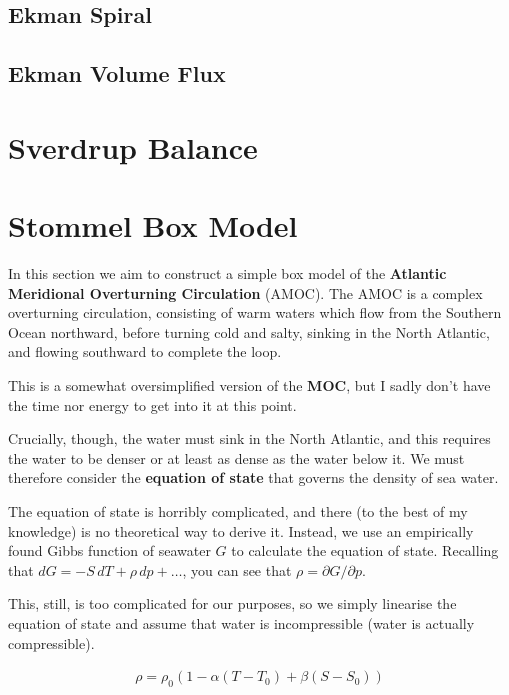 \subsection{Ekman Spiral}

\subsection{Ekman Volume Flux}

\section{Sverdrup Balance}\label{Sverdrup Balance}

\section{Stommel Box Model}\label{MOC}

In this section we aim to construct a simple box model of the \textbf{Atlantic Meridional Overturning Circulation} (AMOC). The AMOC is a complex overturning circulation, consisting of warm waters which flow from the Southern Ocean northward, before turning cold and salty, sinking in the North Atlantic, and flowing southward to complete the loop.

This is a somewhat oversimplified version of the \textbf{MOC}, but I sadly don't have the time nor energy to get into it at this point. 

Crucially, though, the water must sink in the North Atlantic, and this requires the water to be denser or at least as dense as the water below it. We must therefore consider the \textbf{equation of state} that governs the density of sea water.

The equation of state is horribly complicated, and there (to the best of my knowledge) is no theoretical way to derive it. Instead, we use an empirically found Gibbs function of seawater $G$ to calculate the equation of state. Recalling that $dG = -S\,dT + \rho\,dp+\dots$, you can see that $\rho=\partial G/\partial p$.

This, still, is too complicated for our purposes, so we simply linearise the equation of state and assume that water is incompressible (water is actually compressible).

\begin{gather}
    \rho=\rho_0(1-\alpha (T-T_0)+\beta(S-S_0))
\end{gather}